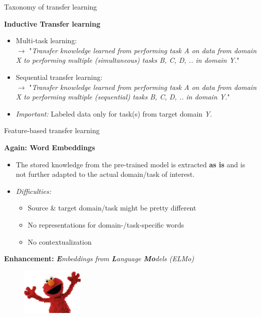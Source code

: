 \documentclass[]{beamer}
\begin{document}
\begin{frame}{Taxonomy of transfer learning \href{https://ruder.io/thesis/}{}}

	\textbf{Inductive Transfer learning}

	\begin{itemize}
		\item Multi-task learning:\\
					$\rightarrow$ "\textit{Transfer knowledge learned from performing task A on data from domain X to performing multiple (simultaneous) tasks B, C, D, .. in domain Y.}"\\\mbox{}
		\item Sequential transfer learning:\\
					$\rightarrow$ "\textit{Transfer knowledge learned from performing task A on data from domain X to performing multiple (sequential) tasks B, C, D, .. in domain Y.}"\\\mbox{}
		\item \textit{Important:} Labeled data only for task(s) from target domain \textit{Y}.
	\end{itemize}
\end{frame}



\begin{frame}{Feature-based transfer learning}

	\textbf{Again: Word Embeddings}

	\begin{itemize}
		\item The stored knowledge from the pre-trained model is extracted \textbf{as is} and is not further adapted to the actual domain/task of interest.
		\item \textit{Difficulties:}
			\begin{itemize}
				\item Source \& target domain/task might be pretty different
				\item No representations for domain-/task-specific words
				\item No contextualization
			\end{itemize}
	\end{itemize}

	\textbf{Enhancement:} \textit{\textbf{E}mbeddings from \textbf{L}anguage \textbf{Mo}dels (ELMo)}

	\begin{figure}
		\centering
		\includegraphics[width = 3cm]{figure/elmo.jpg}
	\end{figure}
\end{frame}
\end{document}
